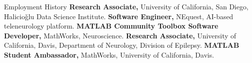 \begin{rubric}{Employment History}
%
	\textbf{Research Associate,} University of California, San Diego, Halicio\v{g}lu Data Science Institute.
%
%
%
        \textbf{Software Engineer,} NEquest, AI-based teleneurology platform.
%
\entry*[2022 -- 2023]%
	\textbf{MATLAB Community Toolbox Software Developer,} MathWorks, Neuroscience.
%
\entry*[2022 -- 2023]%
        \textbf{Research Associate,} University of California, Davis, Department of Neurology, Division of Epilepsy.
%
\entry*[2020 -- 2022]%
        \textbf{MATLAB Student Ambassador,} MathWorks, University of California, Davis.
%
\end{rubric}